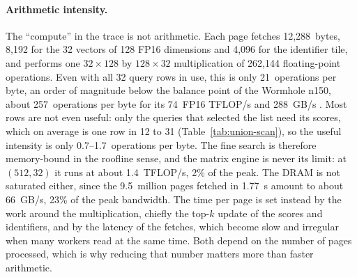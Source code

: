 \paragraph{Arithmetic intensity.} The ``compute'' in the trace is not
arithmetic. Each page fetches 12,288~bytes, 8,192 for the 32 vectors of 128
FP16 dimensions and 4,096 for the identifier tile, and performs one
\(32\times128\) by \(128\times32\) multiplication of 262,144 floating-point
operations. Even with all 32 query rows in use, this is only 21~operations per
byte, an order of magnitude below the balance point of the Wormhole n150, about
257~operations per byte for its 74~FP16 TFLOP/s and 288~GB/s
\cite{tenstorrent_wormhole_spec}. Most rows are not even useful: only the
queries that selected the list need its scores, which on average is one row
in 12 to 31 (Table~\ref{tab:union-scan}), so the useful intensity is only
0.7--1.7~operations per byte. The fine search is therefore memory-bound in the
roofline sense, and the matrix engine is never its limit: at \((512,32)\) it
runs at about 1.4~TFLOP/s, 2\% of the peak. The DRAM is not saturated either,
since the 9.5~million pages fetched in 1.77~s amount to about 66~GB/s, 23\% of
the peak bandwidth. The time per page is set instead by the work around the
multiplication, chiefly the top-\(k\) update of the scores and identifiers, and
by the latency of the fetches, which become slow and irregular when many
workers read at the same time. Both depend on the number of pages processed,
which is why reducing that number matters more than faster arithmetic.

